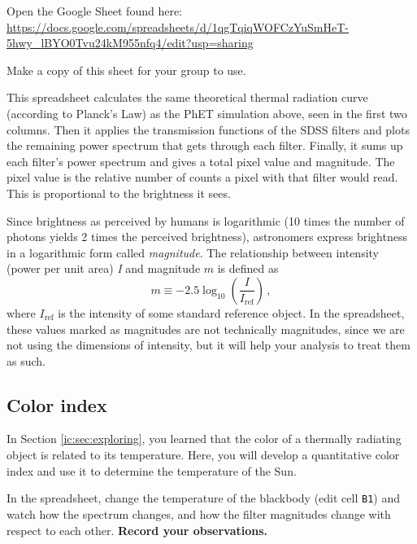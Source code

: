 \begin{steps}
	\item Open the Google Sheet found here: \url{https://docs.google.com/spreadsheets/d/1qgTqiqWOFCzYuSmHeT-5hwy_lBYO0Tvu24kM955nfq4/edit?usp=sharing}
	
	\item Make a copy of this sheet for your group to use.
\end{steps}

This spreadsheet calculates the same theoretical thermal radiation curve (according to Planck's Law) as the PhET simulation above, seen in the first two columns. Then it applies the transmission functions of the SDSS filters and plots the remaining power spectrum that gets through each filter. Finally, it sums up each filter's power spectrum and gives a total pixel value and magnitude. The pixel value is the relative number of counts a pixel with that filter would read. This is proportional to the brightness it sees.

Since brightness as perceived by humans is logarithmic (10 times the number of photons yields 2 times the perceived brightness), astronomers express brightness in a logarithmic form called \textit{magnitude}. The relationship between intensity (power per unit area) \textit{I} and magnitude $m$ is defined as
\begin{equation}
 m \equiv -2.5 \log_{10} \left(\frac{I}{I_\textrm{ref}}\right) \,,
\end{equation}
where $I_\textrm{ref}$ is the intensity of some standard reference object. In the spreadsheet, these values marked as magnitudes are not technically magnitudes, since we are not using the dimensions of intensity, but it will help your analysis to treat them as such.

\subsection{Color index}

In Section \ref{ic:sec:exploring}, you learned that the color of a thermally radiating object is related to its temperature. Here, you will develop a quantitative color index and use it to determine the temperature of the Sun.

\begin{steps}
	\item In the spreadsheet, change the temperature of the blackbody (edit cell \texttt{B1}) and watch how the spectrum changes, and how the filter magnitudes change with respect to each other. \textbf{Record your observations.}
\end{steps}
	
